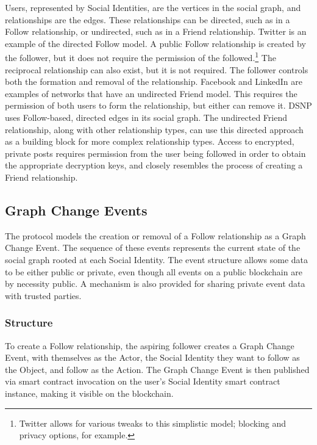 \documentclass[12pt,letterpaper]{article}
\begin{document}
Users, represented by Social Identities, are the vertices in the social graph, and
relationships are the edges. These relationships can be directed, such as in a Follow
relationship, or undirected, such as in a Friend relationship. Twitter is an example of
the directed Follow model. A public Follow relationship is created by the follower, but it
does not require the permission of the followed.\footnote{Twitter allows for various
	tweaks to this simplistic model; blocking and privacy options, for example.} The
reciprocal relationship can also exist, but it is not required. The follower controls both
the formation and removal of the relationship. Facebook and LinkedIn are examples of
networks that have an undirected Friend model. This requires the permission of both users
to form the relationship, but either can remove it. DSNP uses Follow-based, directed edges
in its social graph. The undirected Friend relationship, along with other relationship
types, can use this directed approach as a building block for more complex relationship
types. Access to encrypted, private posts requires permission from the user being followed
in order to obtain the appropriate decryption keys, and closely resembles the process of
creating a Friend relationship.

\subsection{Graph Change Events}\label{sec:graph_change_events}

The protocol models the creation or removal of a Follow relationship as a Graph Change
Event. The sequence of these events represents the current state of the social graph
rooted at each Social Identity. The event structure allows some data to be either public
or private, even though all events on a public blockchain are by necessity public. A
mechanism is also provided for sharing private event data with trusted parties.

\subsubsection{Structure}

To create a Follow relationship, the aspiring follower creates a Graph Change Event, with
themselves as the Actor, the Social Identity they want to follow as the Object, and follow
as the Action. The Graph Change Event is then published via smart contract invocation on
the user's Social Identity smart contract instance, making it visible on the blockchain.
\end{document}
